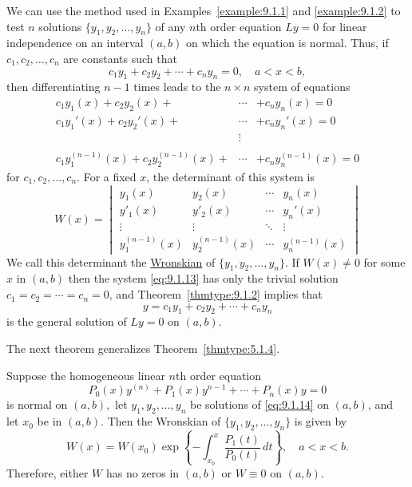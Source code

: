 \documentclass{ximera}
\begin{document}
We can use the method used in Examples~\ref{example:9.1.1} and
\ref{example:9.1.2} to test $n$ solutions $\{y_1,y_2,\dots,y_n\}$ of any
$n$th order equation $Ly=0$ for linear independence on an interval
$(a,b)$ on which the equation is normal. Thus, if $c_1, c_2 ,\dots, c_n$ are constants such that
$$
c_1y_1+c_2y_2+\cdots+c_ny_n=0,\quad a<x<b,
$$
then differentiating $n-1$ times leads to the $n\times n$
system of equations
\begin{equation} \label{eq:9.1.13}
\begin{array}{rcl}
c_1y_1(x)+c_2y_2(x)+&\cdots&+c_ny_n(x)=0\\
c_1y_1'(x)+c_2y_2'(x)+&\cdots&+c_ny_n'(x)=0\\
&\vdots&\\
&&\\
c_1y_1^{(n-1)}(x)+c_2y_2^{(n-1)}(x)+&\cdots&+c_ny_n^{(n-1)}(x)
=0
\end{array}
\end{equation}
for $c_1, c_2, \dots, c_n$. For a fixed $x$,  the determinant of this
system is
$$
W(x)=\begin{vmatrix}
y_1(x)&y_2(x)&\cdots&y_n(x)\\
y'_1(x)&y'_2(x)&\cdots&y_n'(x)\\
\vdots&\vdots&\ddots&\vdots\\
y_1^{(n-1)}(x)&y_2^{(n-1)}(x)&\cdots&y_n^{(n-1)}(x)
\end{vmatrix}
$$
We call this determinant the
\href{http://www-history.mcs.st-and.ac.uk/Mathematicians/Wronski.html}{Wronskian} of
$\{y_1,y_2,\dots,y_n\}$. If $W(x)\neq 0$ for some $x$ in $(a,b)$ then
 the system \eqref{eq:9.1.13} has only the trivial solution
$c_1=c_2=\cdots=c_n=0$, and Theorem~\ref{thmtype:9.1.2} implies that
$$
y=c_1y_1+c_2y_2+\cdots+c_ny_n
$$
is the general solution of $Ly=0$ on $(a,b)$.


The next theorem generalizes Theorem~\ref{thmtype:5.1.4}.

\begin{theorem}\label{thmtype:9.1.3}
 Suppose the   homogeneous linear $n$th order equation
\begin{equation}\label{eq:9.1.14}
P_0(x)y^{(n)}+P_1(x)y^{n-1}+\cdots+P_n(x)y=0
\end{equation}
is normal on $(a,b),$ let $y_1, y_2, \dots, y_n$ be solutions of
\eqref{eq:9.1.14} on $(a,b)$, and let $x_0$ be in $(a,b)$. Then the
Wronskian of $\{y_1,y_2,\dots,y_n\}$ is given by
\begin{equation}  \label{eq:9.1.15}
W(x)=W(x_0)\exp\left\{-\int^x_{x_0}\frac{P_1(t)}{P_0(t)}\,
dt\right\},\quad a<x<b.
\end{equation}
Therefore,  either $W$ has no zeros in  $(a,b)$ or $W\equiv0$
on  $(a,b)$.
\end{theorem}
\end{document}
